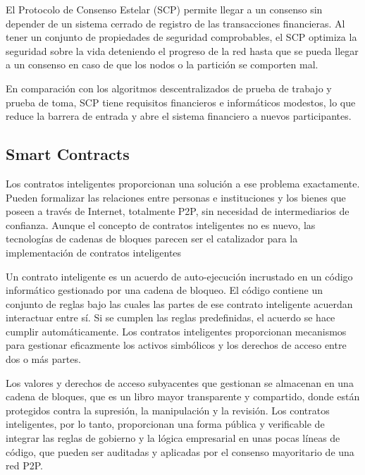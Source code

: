 \vspace{5mm}

\noindent El Protocolo de Consenso Estelar (SCP) permite llegar a un consenso sin depender de un sistema cerrado de 
registro de las transacciones financieras. Al tener un conjunto de propiedades de seguridad comprobables, el SCP 
optimiza la seguridad sobre la vida deteniendo el progreso de la red hasta que se pueda llegar a un consenso en 
caso de que los nodos o la partición se comporten mal.

\vspace{5mm}

\noindent En comparación con los algoritmos descentralizados de prueba de trabajo y prueba de toma, SCP tiene requisitos 
financieros e informáticos modestos, lo que reduce la barrera de entrada y abre el sistema financiero a nuevos 
participantes.

\subsection{Smart Contracts}

Los contratos inteligentes proporcionan una solución a ese problema exactamente. Pueden formalizar las relaciones entre personas e instituciones y los bienes que poseen a través de Internet, totalmente P2P, sin necesidad de intermediarios de confianza. Aunque el concepto de contratos inteligentes no es nuevo, las tecnologías de cadenas de bloques parecen ser el catalizador para la implementación de contratos inteligentes

Un contrato inteligente es un acuerdo de auto-ejecución incrustado en un código informático gestionado por una cadena de bloqueo. El código contiene un conjunto de reglas bajo las cuales las partes de ese contrato inteligente acuerdan interactuar entre sí. Si se cumplen las reglas predefinidas, el acuerdo se hace cumplir automáticamente. Los contratos inteligentes proporcionan mecanismos para gestionar eficazmente los activos simbólicos y los derechos de acceso entre dos o más partes. 

Los valores y derechos de acceso subyacentes que gestionan se almacenan en una cadena de bloques, que es un libro mayor transparente y compartido, donde están protegidos contra la supresión, la manipulación y la revisión. Los contratos inteligentes, por lo tanto, proporcionan una forma pública y verificable de integrar las reglas de gobierno y la lógica empresarial en unas pocas líneas de código, que pueden ser auditadas y aplicadas por el consenso mayoritario de una red P2P.


